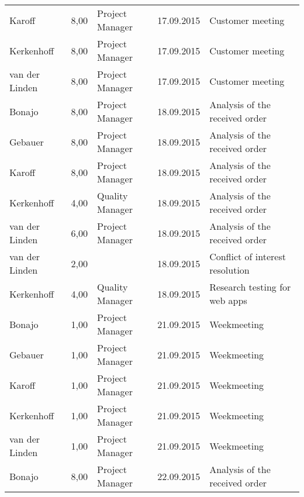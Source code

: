 \begin{longtable}{ l r p{2cm} c p{4cm} }
		Karoff                  & 8,00           & Project Manager & 17.09.2015    & Customer meeting                              \\
		Kerkenhoff              & 8,00           & Project Manager & 17.09.2015    & Customer meeting                              \\
		van der Linden          & 8,00           & Project Manager & 17.09.2015    & Customer meeting                              \\
		Bonajo                  & 8,00           & Project Manager & 18.09.2015    & Analysis of the received order               \\
		Gebauer                 & 8,00           & Project Manager & 18.09.2015    & Analysis of the received order               \\
		Karoff                  & 8,00           & Project Manager & 18.09.2015    & Analysis of the received order               \\
		Kerkenhoff              & 4,00           & Quality Manager & 18.09.2015    & Analysis of the received order               \\
		van der Linden          & 6,00           & Project Manager & 18.09.2015    & Analysis of the received order               \\
		van der Linden          & 2,00           &                 & 18.09.2015    & Conflict of interest resolution              \\
		Kerkenhoff              & 4,00           & Quality Manager & 18.09.2015    & Research testing for web apps                 \\
		Bonajo                  & 1,00           & Project Manager & 21.09.2015    & Weekmeeting                                  \\
		Gebauer                 & 1,00           & Project Manager & 21.09.2015    & Weekmeeting                                  \\
		Karoff                  & 1,00           & Project Manager & 21.09.2015    & Weekmeeting                                  \\
		Kerkenhoff              & 1,00           & Project Manager & 21.09.2015    & Weekmeeting                                  \\
		van der Linden          & 1,00           & Project Manager & 21.09.2015    & Weekmeeting                                  \\
		Bonajo                  & 8,00           & Project Manager & 22.09.2015    & Analysis of the received order               \\

\end{longtable}
